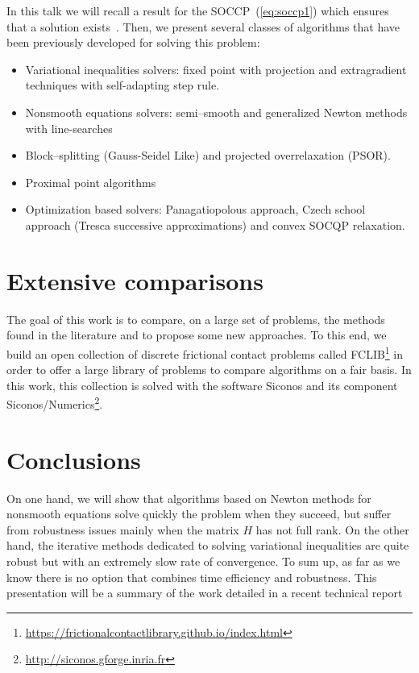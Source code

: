 \documentclass[11pt,a4paper]{article}
\begin{document}
In this talk we will recall a result for the SOCCP~(\ref{eq:soccp1}) which ensures that a solution exists~\cite{Acary.ea_ZAMM2011}. Then, we present several classes of algorithms that have been previously developed for solving this problem:
\begin{itemize}
  \setlength\itemsep{0em}
\item Variational inequalities solvers: fixed point with projection and extragradient techniques with self-adapting step rule.
\item Nonsmooth equations solvers: semi--smooth and generalized Newton methods with line-searches
\item Block--splitting (Gauss-Seidel Like) and projected overrelaxation (PSOR).
\item Proximal point algorithms
\item Optimization based solvers: Panagatiopolous approach, Czech school approach (Tresca successive approximations) and convex SOCQP relaxation.
\end{itemize}
\vspace{-0.6cm}\section{Extensive comparisons}
The goal of this work is to compare, on a large set of problems, the methods found in the literature and to propose some new approaches. To this end, we build an open collection of discrete frictional contact problems called FCLIB\footnote{\href{https://frictionalcontactlibrary.github.io/index.html}{https://frictionalcontactlibrary.github.io/index.html}} in order to offer a large library of problems to compare algorithms on a fair basis.  In this work, this collection is solved with the software {\sc Siconos} and its component {\sc Siconos/Numerics}\footnote{\href{http://siconos.gforge.inria.fr}{http://siconos.gforge.inria.fr}}.


\vspace{-0.5cm}\section{Conclusions}

On one hand, we will show that algorithms based on Newton methods for nonsmooth equations solve quickly the problem when they succeed, but suffer from robustness issues mainly when the matrix $H$ has not full rank. On the other hand, the 
iterative methods dedicated to solving variational inequalities are quite robust but with an extremely slow rate of convergence. To sum up, as far as we know there is no option that combines time efficiency and robustness. This presentation will be a summary of the work detailed in a recent technical report~\cite{acary:hal-01630836}
\end{document}
